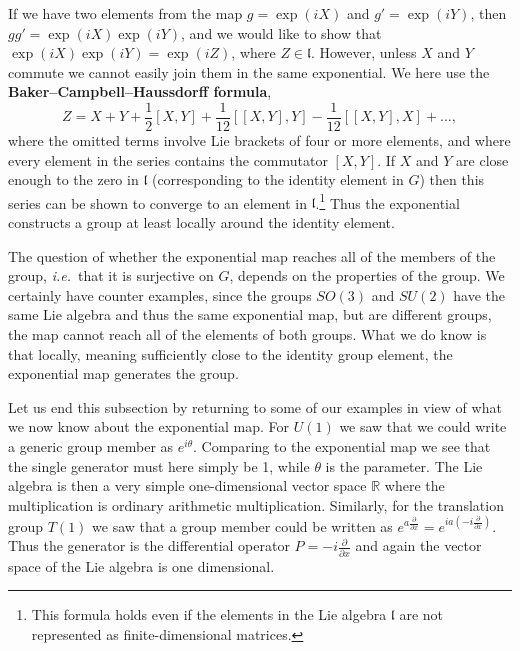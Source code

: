 \documentclass[notes.tex]{subfiles}
\begin{document}
If we have two elements from the map $g=\exp{(iX)}$ and $g'=\exp{(iY)}$, then $gg'=\exp{(iX)}\exp{(iY)}$, and we would like to show that  $\exp{(iX)}\exp{(iY)}=\exp{(iZ)}$, where $Z\in\mathfrak l$. However, unless $X$ and $Y$ commute we cannot  easily join them in the same exponential. We here use the {\bf Baker--Campbell--Haussdorff  formula},
\begin{equation}
Z=X+Y+\frac{1}{2}[X,Y]+\frac{1}{12}[[X,Y],Y]-\frac{1}{12}[[X,Y],X]+\ldots,
\label{eq:BKH_matrices}
\end{equation}
where the omitted terms involve Lie brackets of four or more elements, and where every element in the series contains the commutator $[X,Y]$. If $X$ and $Y$ are close enough to the zero in $\mathfrak l$ (corresponding to the identity element in $G$) then this series can be shown to converge to an element in $\mathfrak l$.\footnote{This formula holds even if the elements in the Lie algebra ${\mathfrak l}$ are not represented as finite-dimensional matrices.} Thus the exponential constructs a group at least locally around the identity element.

The question of whether the exponential map reaches all of the members of the group, {\it i.e.}\ that it is surjective on $G$, depends on the properties of the group. We certainly have counter examples, since the groups $SO(3)$ and $SU(2)$ have the same Lie algebra and thus the same exponential map, but are different groups, the map cannot reach all of the elements of both groups. What we do know is that locally, meaning sufficiently close to the identity group element, the exponential map generates the group.

Let us end this subsection by returning to some of our examples in view of what we now know about the exponential map. For $U(1)$ we saw that we could write a generic group member as $e^{i\theta}$. Comparing to the exponential map we see that the single generator must here simply be 1, while $\theta$ is the parameter. The Lie algebra is then a very simple one-dimensional vector space $\mathbb R$ where the multiplication is ordinary arithmetic multiplication. Similarly, for the translation group $T(1)$ we saw that a group member could be written as $e^{a\frac{\partial}{\partial x}}=e^{ia(-i\frac{\partial}{\partial x})}$. Thus the generator is the differential operator $P=-i\frac{\partial}{\partial x}$ and again the vector space of the Lie algebra is one dimensional.
\end{document}
